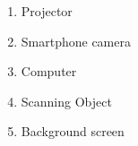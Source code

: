 
\begin{enumerate}
    \item Projector
    \item Smartphone camera
    \item Computer
    \item Scanning Object
    \item Background screen
\end{enumerate}
